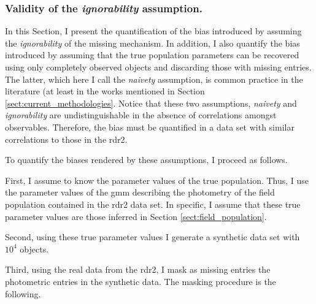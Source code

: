 \subsubsection{Validity of the \emph{ignorability} assumption.}
\label{sect:ignorability}

In this Section, I present the quantification of the bias introduced by assuming the \emph{ignorability} of the missing mechanism. In addition, I also quantify the bias introduced by assuming that the true population parameters can be recovered using only completely observed objects and discarding those with missing entries. The latter, which here I call the \emph{naivety} assumption, is common practice in the literature (at least in the works mentioned in Section \ref{sect:current_methodologies}. Notice that these two assumptions, \emph{naivety} and \emph{ignorability} are undistinguishable in the absence of correlations amongst observables. Therefore, the bias must be quantified in a data set with similar correlations to those in the \gls{rdr2}.

To quantify the biases rendered by these assumptions, I proceed as follows.

First, I assume to know the parameter values of the true population. Thus, I use the parameter values of the \gls{gmm} describing the photometry of the field population contained in the \gls{rdr2} data set. In specific, I assume that these true parameter values are those inferred in Section \ref{sect:field_population}. 

Second, using these true parameter values I generate a synthetic data set with $10^4$ objects.

Third, using the real data from the \gls{rdr2}, I mask as missing entries the photometric entries in the synthetic data. The masking procedure is the following.

